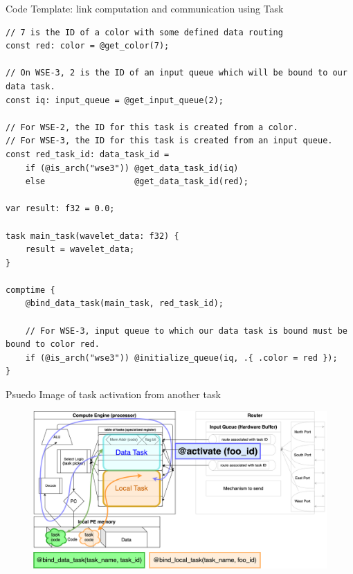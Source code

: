 \documentclass[dvipdfmx, 11pt, aspectratio=169]{beamer}   %
\begin{document}
\begin{frame}[fragile]{Code Template: link computation and communication using Task}
\begin{lstlisting}[language=CSL, basicstyle=\ttfamily\tiny]
// 7 is the ID of a color with some defined data routing
const red: color = @get_color(7);

// On WSE-3, 2 is the ID of an input queue which will be bound to our data task.
const iq: input_queue = @get_input_queue(2);

// For WSE-2, the ID for this task is created from a color.
// For WSE-3, the ID for this task is created from an input queue.
const red_task_id: data_task_id =
    if (@is_arch("wse3")) @get_data_task_id(iq)
    else                  @get_data_task_id(red);

var result: f32 = 0.0;

task main_task(wavelet_data: f32) {
    result = wavelet_data;
}

comptime {
    @bind_data_task(main_task, red_task_id);

    // For WSE-3, input queue to which our data task is bound must be bound to color red.
    if (@is_arch("wse3")) @initialize_queue(iq, .{ .color = red });
}
\end{lstlisting}
\end{frame}
\begin{frame}{Psuedo Image of task activation from another task}
\begin{figure}
    \includegraphics[scale=0.08]{img/localTaskActivation.png}
\end{figure}
\end{frame}
\end{document}
